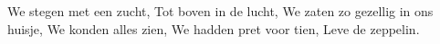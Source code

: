 \beginverse*
We stegen met een zucht,
Tot boven in de lucht,
We zaten zo gezellig in ons huisje,
We konden alles zien,
We hadden pret voor tien,
Leve de zeppelin.
\endverse
\endsong